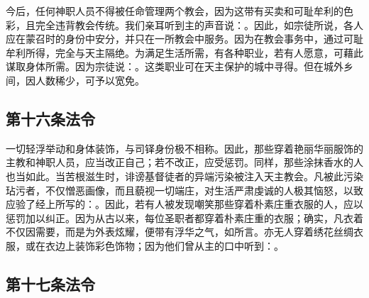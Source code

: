 \par

今后，任何神职人员不得被任命管理两个教会，因为这带有买卖和可耻牟利的色彩，且完全违背教会传统。我们亲耳听到主的声音说：。因此，如宗徒所说，各人应在蒙召时的身份中安分，并只在一所教会中服务。因为在教会事务中，通过可耻牟利所得，完全与天主隔绝。为满足生活所需，有各种职业，若有人愿意，可藉此谋取身体所需。因为宗徒说：。这类职业可在天主保护的城中寻得。但在城外乡间，因人数稀少，可予以宽免。\par

\par


\subsection{第十六条法令}

\par

一切轻浮举动和身体装饰，与司铎身份极不相称。因此，那些穿着艳丽华丽服饰的主教和神职人员，应当改正自己；若不改正，应受惩罚。同样，那些涂抹香水的人也当如此。当苦根滋生时，诽谤基督徒者的异端污染被注入天主教会。凡被此污染玷污者，不仅憎恶画像，而且藐视一切端庄，对生活严肃虔诚的人极其恼怒，以致应验了经上所写的：。因此，若有人被发现嘲笑那些穿着朴素庄重衣服的人，应以惩罚加以纠正。因为从古以来，每位圣职者都穿着朴素庄重的衣服；确实，凡衣着不仅因需要，而是为外表炫耀，便带有浮华之气，如所言。亦无人穿着绣花丝绸衣服，或在衣边上装饰彩色饰物；因为他们曾从主的口中听到：。\par

\par


\subsection{第十七条法令}

